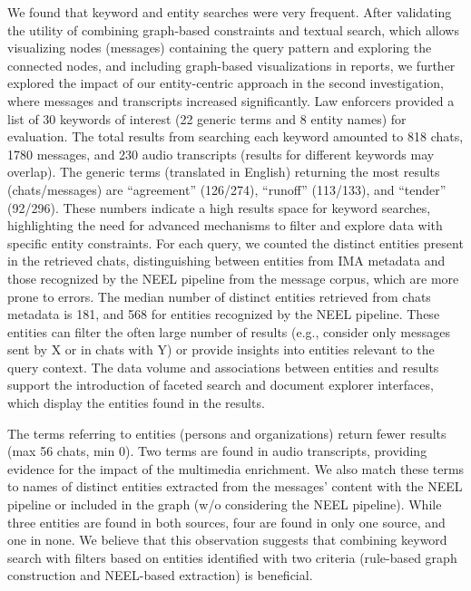 We found that keyword and entity searches were very frequent. After validating the utility of combining graph-based constraints and textual search, which allows visualizing nodes (messages) containing the query pattern and exploring the connected nodes, and including graph-based visualizations in reports, we further explored the impact of our entity-centric approach in the second investigation, where messages and transcripts increased significantly. Law enforcers provided a list of 30 keywords of interest (22 generic terms and 8 entity names) for evaluation.
The total results from searching each keyword amounted to 818 chats, 1780 messages, and 230 audio transcripts (results for different keywords may overlap). The generic terms (translated in English) returning the most results (chats/messages) are ``agreement'' (126/274), ``runoff'' (113/133), and ``tender'' (92/296). These numbers indicate a high results space for keyword searches, highlighting the need for advanced mechanisms to filter and explore data with specific entity constraints.
For each query, we counted the distinct entities present in the retrieved chats, distinguishing between entities from IMA metadata and those recognized by the NEEL pipeline from the message corpus, which are more prone to errors. The median number of distinct entities retrieved from chats metadata is 181, and 568 for entities recognized by the NEEL pipeline. These entities can filter the often large number of results (e.g., consider only messages sent by X or in chats with Y) or provide insights into entities relevant to the query context. The data volume and associations between entities and results support the introduction of faceted search and document explorer interfaces, which display the entities found in the results.

The terms referring to entities (persons and organizations) return fewer results (max 56 chats, min 0). Two terms are found in audio transcripts, providing evidence for the impact of the multimedia enrichment. We also match these terms to names of distinct entities extracted from the messages' content with the NEEL pipeline or included in the graph (w/o considering the NEEL pipeline). While three entities are found in both sources, four are found in only one source, and one in none. We believe that this observation suggests that combining keyword search with filters based on entities identified with two criteria (rule-based graph construction and NEEL-based extraction) is beneficial.       

